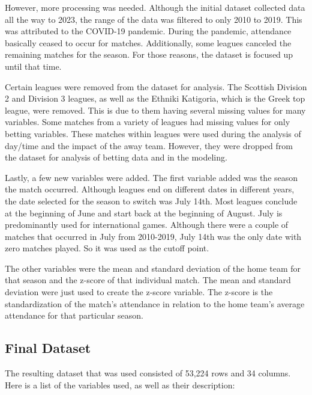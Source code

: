 \documentclass[
  letterpaper,
  DIV=11,
  numbers=noendperiod]{scrartcl}
\begin{document}
However, more processing was needed. Although the initial dataset
collected data all the way to 2023, the range of the data was filtered
to only 2010 to 2019. This was attributed to the COVID-19 pandemic.
During the pandemic, attendance basically ceased to occur for matches.
Additionally, some leagues canceled the remaining matches for the
season. For those reasons, the dataset is focused up until that time.

Certain leagues were removed from the dataset for analysis. The Scottish
Division 2 and Division 3 leagues, as well as the Ethniki Katigoria,
which is the Greek top league, were removed. This is due to them having
several missing values for many variables. Some matches from a variety
of leagues had missing values for only betting variables. These matches
within leagues were used during the analysis of day/time and the impact
of the away team. However, they were dropped from the dataset for
analysis of betting data and in the modeling.

Lastly, a few new variables were added. The first variable added was the
season the match occurred. Although leagues end on different dates in
different years, the date selected for the season to switch was July
14th. Most leagues conclude at the beginning of June and start back at
the beginning of August. July is predominantly used for international
games. Although there were a couple of matches that occurred in July
from 2010-2019, July 14th was the only date with zero matches played. So
it was used as the cutoff point.

The other variables were the mean and standard deviation of the home
team for that season and the z-score of that individual match. The mean
and standard deviation were just used to create the z-score variable.
The z-score is the standardization of the match's attendance in relation
to the home team's average attendance for that particular season.

\hypertarget{final-dataset}{%
\subsection{Final Dataset}\label{final-dataset}}

The resulting dataset that was used consisted of 53,224 rows and 34
columns. Here is a list of the variables used, as well as their
description:
\end{document}
